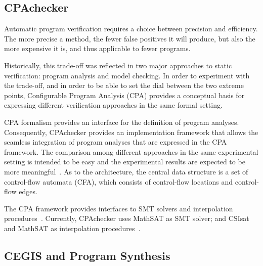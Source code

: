 \subsection{CPAchecker}

Automatic program verification requires a choice between precision and efficiency. The more precise a method, the fewer false positives it will produce, but also the more expensive it is, and thus applicable to fewer programs. 

Historically, this trade-off was reflected in two major approaches to static verification: program analysis and model checking. In order to experiment with the trade-off, and in order to be able to set the dial between the two extreme points, Configurable Program Analysis (CPA) provides a conceptual basis for expressing different verification approaches in the same formal setting. 

CPA formalism provides an interface for the definition of program analyses. Consequently, CPAchecker provides an implementation framework that allows the seamless integration of program analyses that are expressed in the CPA framework. The comparison among different approaches in the same experimental setting is intended to be easy and the experimental results are expected to be more meaningful~\cite{Beyer2011}. As to the architecture, the central data structure is a set of control-flow automata (CFA), which consists of control-flow locations and control-flow edges. 

The CPA framework provides interfaces to SMT solvers and interpolation procedures~\cite{Beyer2011}. Currently, CPAchecker uses MathSAT as SMT solver; and CSIsat and MathSAT as interpolation procedures~\cite{Beyer2011}. %

\subsection{CEGIS and Program Synthesis}
\label{sec:ProgramSynthesis}


